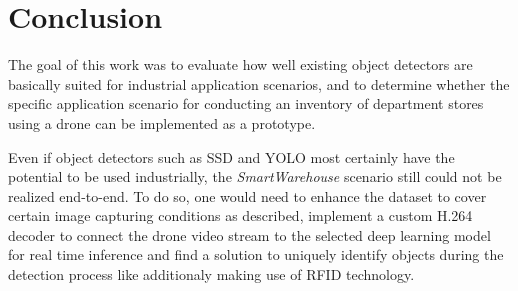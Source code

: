 \documentclass[a4paper, 10pt, journal]{wissarbIEEE}      %
\begin{document}
\section{Conclusion} \label{conclusion}

The goal of this work was to evaluate how well existing object detectors are basically suited for industrial application scenarios, and to determine whether the specific application scenario for conducting an inventory of department stores using a drone can be implemented as a prototype. 

Even if object detectors such as SSD and YOLO most certainly have the potential to be used industrially, the \textit{SmartWarehouse} scenario still could not be realized end-to-end. To do so, one would need to enhance the dataset to cover certain image capturing conditions as described, implement a custom H.264 decoder to connect the drone video stream to the selected deep learning model for real time inference and find a solution to uniquely identify objects during the detection process like additionaly making use of RFID technology. 


\end{document}
